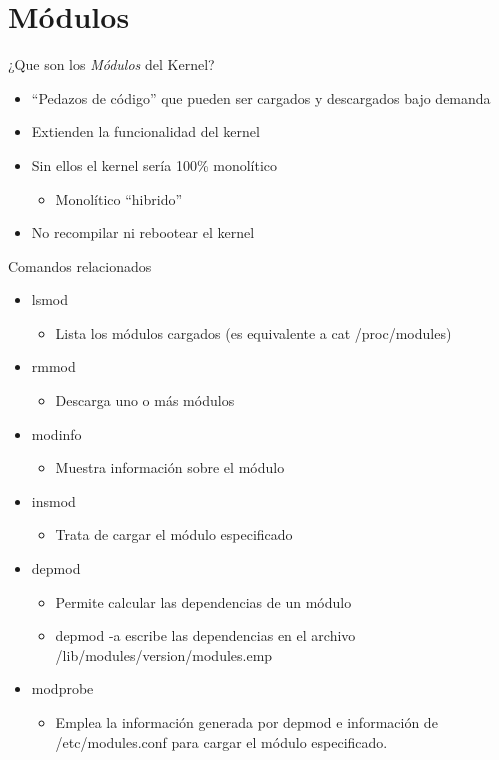\section{Módulos}

\begin{frame}{¿Que son los \textit{Módulos} del Kernel?}
  \begin{itemize}
  \item “Pedazos de código” que pueden ser cargados y descargados bajo demanda 
  \item Extienden la funcionalidad del kernel
  \item Sin ellos el kernel sería 100\% monolítico   
  \begin{itemize}
    \item Monolítico ``hibrido''
  \end{itemize} 
 \item No recompilar ni rebootear el kernel
  \end{itemize}
\end{frame}

\begin{frame}{Comandos relacionados}
  \begin{itemize}
  \item lsmod 
  	\begin{itemize}
  	  \item Lista los módulos cargados (es equivalente a cat /proc/modules) 
  	\end{itemize} 
  \item rmmod
  	\begin{itemize}
  	  \item Descarga uno o más módulos 
  	\end{itemize} 
  \item modinfo   
	  \begin{itemize}
	    \item  Muestra información sobre el módulo 
	  \end{itemize} 
 \item insmod
	  \begin{itemize}
	    \item Trata de cargar el módulo especificado 
	  \end{itemize} 
 \item depmod
	  \begin{itemize}
	    \item Permite calcular las dependencias de un módulo
             \item depmod -a escribe las dependencias en el archivo /lib/modules/version/modules.emp  
	  \end{itemize} 
 \item modprobe    
 	\begin{itemize}
             \item Emplea la información generada por depmod e información de /etc/modules.conf 
             para cargar el módulo especificado. 
  	\end{itemize} 
  \end{itemize}

\end{frame}


